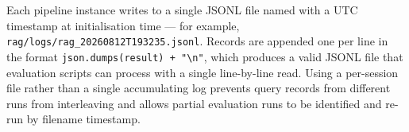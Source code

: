 Each pipeline instance writes to a single JSONL file named with a UTC timestamp at initialisation time — for example, \texttt{rag/logs/rag\_20260812T193235.jsonl}. Records are appended one per line in the format \texttt{json.dumps(result) + "\textbackslash n"}, which produces a valid JSONL file that evaluation scripts can process with a single line-by-line read. Using a per-session file rather than a single accumulating log prevents query records from different runs from interleaving and allows partial evaluation runs to be identified and re-run by filename timestamp.
